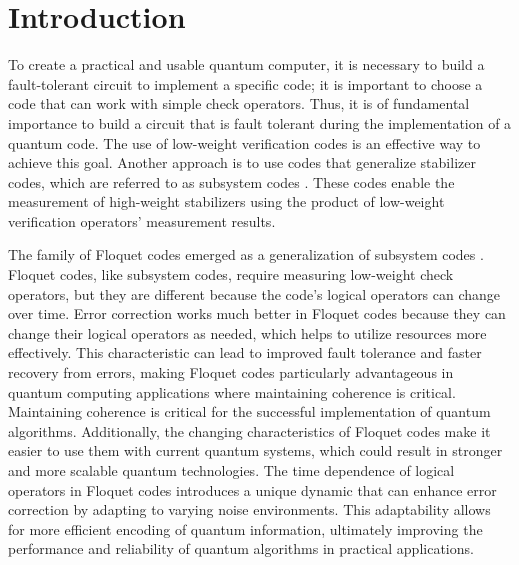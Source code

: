 \documentclass[%
reprint,
amsmath,amssymb,
aps,
]{revtex4-2}
\begin{document}
\maketitle
	



\section{Introduction}

To create a practical and usable quantum computer, it is necessary to build a fault-tolerant circuit to implement a specific code; it is important to choose a code that can work with simple check operators. Thus, it is of fundamental importance to build a circuit that is fault tolerant during the implementation of a quantum code. The use of low-weight verification codes is an effective way to achieve this goal. Another approach is to use codes that generalize stabilizer codes, which are referred to as subsystem codes \cite{Poulin1}. These codes enable the measurement of high-weight stabilizers using the product of low-weight verification operators' measurement results.

The family of Floquet codes \cite{Hastings2021} emerged as a generalization of subsystem codes \cite{8}. Floquet codes, like subsystem codes, require measuring low-weight check operators, but they are different because the code's logical operators can change over time. Error correction works much better in Floquet codes because they can change their logical operators as needed, which helps to utilize resources more effectively. This characteristic can lead to improved fault tolerance and faster recovery from errors, making Floquet codes particularly advantageous in quantum computing applications where maintaining coherence is critical. Maintaining coherence is critical for the successful implementation of quantum algorithms. Additionally, the changing characteristics of Floquet codes make it easier to use them with current quantum systems, which could result in stronger and more scalable quantum technologies. The time dependence of logical operators in Floquet codes introduces a unique dynamic that can enhance error correction by adapting to varying noise environments. This adaptability allows for more efficient encoding of quantum information, ultimately improving the performance and reliability of quantum algorithms in practical applications.
\end{document}
